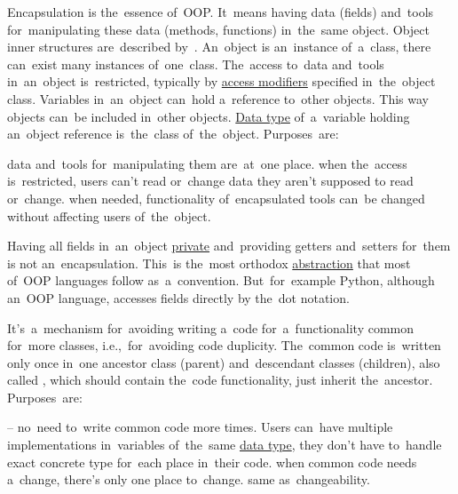 
\label{encapsulation}
Encapsulation is the~essence of~OOP\@.
It~means having data (fields) and~tools for~manipulating these data (methods, functions) in~the~same object.
Object inner structures are~described by~.
An~object is an~instance of~a~class, there can~exist many instances of~one~class.
The~access to~data and~tools in~an~object is~restricted, typically by \hyperref[javaaccessmodifiers]{access modifiers} specified in~the~object class.
Variables in~an~object can~hold a~reference to~other objects.
This way objects can~be included in~other objects.
\hyperref[datatypes]{Data type} of~a~variable holding an~object reference is~the~class of~the~object.
Purposes~are:
\begin{itemize}
     data and~tools for~manipulating them are~at~one place.
     when the~access is~restricted, users can't read or~change data they aren't supposed to read or~change.
     when needed, functionality of~encapsulated tools can~be changed without affecting users of~the~object.
\end{itemize}
\newpage

\warning Having all fields in~an~object \hyperref[javaprivate]{private} and~providing getters and~setters for~them is not an~encapsulation.
This~is the~most orthodox \hyperref[abstraction]{abstraction} that most of~OOP languages follow as~a~convention.
But~for~example Python, although an~OOP language, accesses fields directly by the~dot notation.

\label{inheritance}
It's~a~mechanism for~avoiding writing a~code for~a~functionality common for~more classes, i.e.,~for~avoiding code duplicity.
The~common code is~written only once in~one ancestor class (parent) and~descendant classes (children), also called , which should contain the~code functionality, just inherit the~ancestor.
Purposes~are:
\begin{itemize}
     -- no~need to~write common code more times.
            Users can~have multiple implementations in~variables of~the~same \hyperref[datatypes]{data type}, they don't have to~handle exact concrete type for~each place in~their code.
     when common code needs a~change, there's only one place to~change.
     same as~changeability.
\end{itemize}

